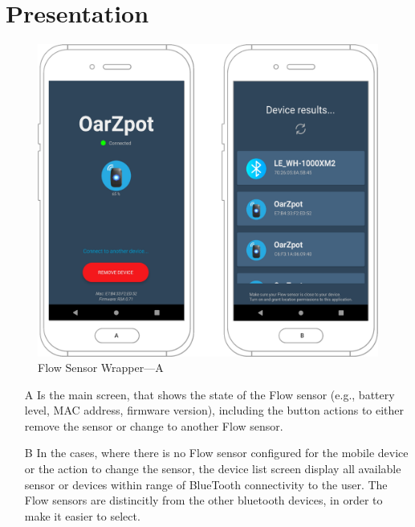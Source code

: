 \section{Presentation}
\begin{figure}
    \centering
    \includegraphics[scale=0.3]{images/flow_app.pdf}
    \caption{Flow Sensor Wrapper---A}
    \label{fig:flowapp}
\end{figure}

\begin{itemize}
    \item[A] Is the main screen, that shows the state of the Flow sensor (e.g., battery level, MAC address, firmware version), including the button actions to either remove the sensor or change to another Flow sensor. 
    \item[B] In the cases, where there is no Flow sensor configured for the mobile device or the action to change the sensor, the device list screen display all available sensor or devices within range of BlueTooth connectivity to the user. The Flow sensors are distincitly from the other bluetooth devices, in order to make it easier to select.
\end{itemize}